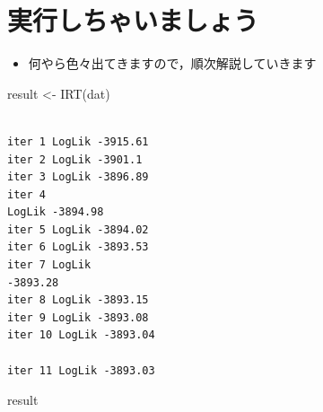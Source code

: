 \documentclass[
  a4paper,
]{ltjsbook}
\newenvironment{Shaded}{\begin{snugshade}}{\end{snugshade}}
\newcommand{\FunctionTok}[1]{\textcolor[rgb]{0.28,0.35,0.67}{#1}}
\newcommand{\NormalTok}[1]{\textcolor[rgb]{0.00,0.23,0.31}{#1}}
\newcommand{\OtherTok}[1]{\textcolor[rgb]{0.00,0.23,0.31}{#1}}
\providecommand{\tightlist}{%
  \setlength{\itemsep}{0pt}\setlength{\parskip}{0pt}}\usepackage{longtable,booktabs,array}
\begin{document}
\section{実行しちゃいましょう}\label{ux5b9fux884cux3057ux3061ux3083ux3044ux307eux3057ux3087ux3046}

\begin{itemize}
\tightlist
\item
  何やら色々出てきますので，順次解説していきます
\end{itemize}

\begin{Shaded}
\begin{Highlighting}[]
\NormalTok{result }\OtherTok{\textless{}{-}} \FunctionTok{IRT}\NormalTok{(dat)}
\end{Highlighting}
\end{Shaded}

\begin{verbatim}

iter 1 LogLik -3915.61 
iter 2 LogLik -3901.1 
iter 3 LogLik -3896.89 
iter 4
LogLik -3894.98 
iter 5 LogLik -3894.02 
iter 6 LogLik -3893.53 
iter 7 LogLik
-3893.28 
iter 8 LogLik -3893.15 
iter 9 LogLik -3893.08 
iter 10 LogLik -3893.04

iter 11 LogLik -3893.03
\end{verbatim}

\begin{Shaded}
\begin{Highlighting}[]
\NormalTok{result}
\end{Highlighting}
\end{Shaded}
\end{document}
